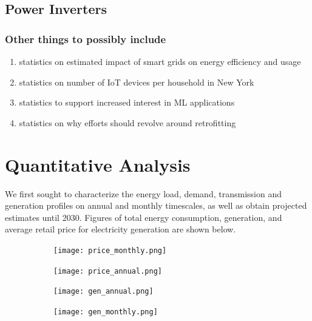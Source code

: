 \documentclass[plain]{article}
\newcommand{\1}{\mathbbm{1}}
\begin{document}
\subsection{Power Inverters}


\subsubsection{Other things to possibly include}
\begin{enumerate}
	\item statistics on estimated impact of smart grids on energy efficiency and usage
	\item statistics on number of IoT devices per household in New York
	\item statistics to support increased interest in ML applications
	\item statistics on why efforts should revolve around retrofitting
\end{enumerate}
\section{Quantitative Analysis}
We first sought to characterize the energy load, demand, transmission and generation profiles on annual and monthly timescales, as well as obtain projected estimates until 2030. Figures of total energy consumption, generation, and average retail price for electricity generation are shown below.

\begin{figure}[H]
	\begin{subfigure}[b]{0.75\textwidth}
		\centering
		\texttt{[image: price\_monthly.png]}
		\caption{}
		\label{fig:}
	\end{subfigure}
	\hfill
	\begin{subfigure}[b]{0.75\textwidth}
		\centering
		\texttt{[image: price\_annual.png]}
		\caption{}
		\label{fig:}
	\end{subfigure}

\end{figure}
\begin{figure}[H]
	\begin{subfigure}[b]{0.75\textwidth}
		\centering
		\texttt{[image: gen\_annual.png]}
		\caption{}
		\label{fig:}
	\end{subfigure}
	\hfill
	\begin{subfigure}[b]{0.75\textwidth}
		\centering
		\texttt{[image: gen\_monthly.png]}
		\caption{}
		\label{fig:}
	\end{subfigure}

\end{figure}
\end{document}
